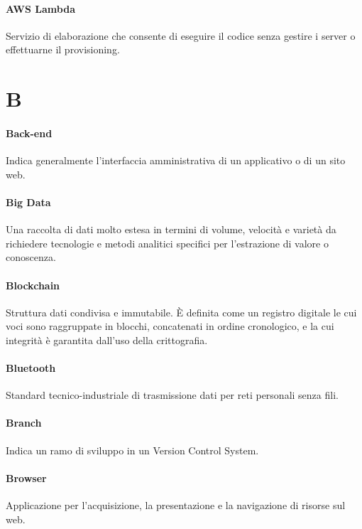 \documentclass[]{article}
\begin{document}
	\paragraph*{AWS Lambda}
	Servizio di elaborazione che consente di eseguire il codice senza gestire i server o effettuarne il provisioning.

	\newpage


	\section*{B}

	\paragraph*{Back-end}
	Indica generalmente l'interfaccia amministrativa di un applicativo o di un sito web.

	\paragraph*{Big Data}
	Una raccolta di dati molto estesa in termini di	volume, velocità e varietà da richiedere tecnologie e metodi analitici specifici per l'estrazione di valore o conoscenza.

	\paragraph*{Blockchain}
	Struttura dati condivisa e immutabile. È definita come un registro digitale le cui voci sono raggruppate in blocchi, concatenati in ordine cronologico, e la cui integrità è garantita dall'uso della crittografia.

	\paragraph*{Bluetooth}
	Standard tecnico-industriale di trasmissione dati per reti personali senza fili.

	\paragraph*{Branch}
	Indica un ramo di sviluppo in un Version Control System.

	\paragraph*{Browser}
	Applicazione per l'acquisizione, la presentazione e la navigazione di risorse sul web.
\end{document}
